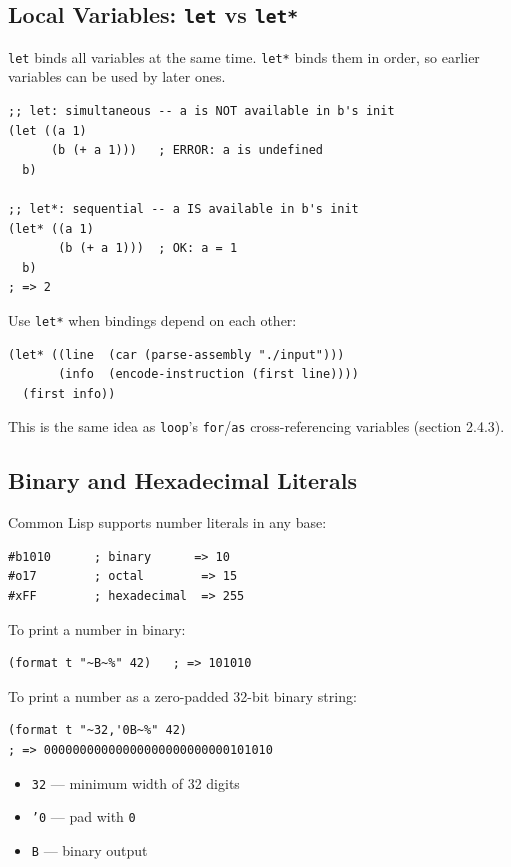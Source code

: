 \subsection{Local Variables: \texttt{let} vs \texttt{let*}}

\texttt{let} binds all variables at the same time.
\texttt{let*} binds them in order, so earlier variables can be
used by later ones.

\begin{lstlisting}
;; let: simultaneous -- a is NOT available in b's init
(let ((a 1)
      (b (+ a 1)))   ; ERROR: a is undefined
  b)

;; let*: sequential -- a IS available in b's init
(let* ((a 1)
       (b (+ a 1)))  ; OK: a = 1
  b)
; => 2
\end{lstlisting}

Use \texttt{let*} when bindings depend on each other:

\begin{lstlisting}
(let* ((line  (car (parse-assembly "./input")))
       (info  (encode-instruction (first line))))
  (first info))
\end{lstlisting}

This is the same idea as \texttt{loop}'s \texttt{for}/\texttt{as}
cross-referencing variables (section 2.4.3).

\subsection{Binary and Hexadecimal Literals}

Common Lisp supports number literals in any base:

\begin{lstlisting}
#b1010      ; binary      => 10
#o17        ; octal        => 15
#xFF        ; hexadecimal  => 255
\end{lstlisting}

To print a number in binary:

\begin{lstlisting}
(format t "~B~%" 42)   ; => 101010
\end{lstlisting}

To print a number as a zero-padded 32-bit binary string:

\begin{lstlisting}
(format t "~32,'0B~%" 42)
; => 00000000000000000000000000101010
\end{lstlisting}

\begin{itemize}
  \item \texttt{32} --- minimum width of 32 digits
  \item \texttt{'0} --- pad with \texttt{0}
  \item \texttt{B} --- binary output
\end{itemize}


